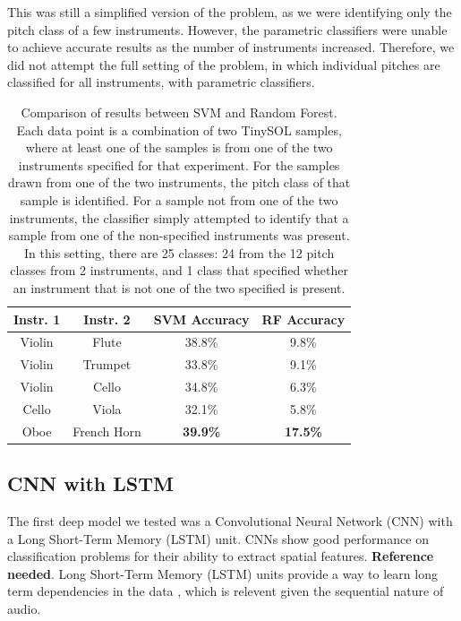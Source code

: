 \documentclass{article}
\begin{document}
This was still a simplified version of the problem, as we were identifying only the pitch class of a few instruments. However, the parametric classifiers were unable to achieve accurate results as the number of instruments increased. Therefore, we did not attempt the full setting of the problem, in which individual pitches are classified for all instruments, with parametric classifiers. 

\begin{table}
  \begin{center}
    \label{tab:table1}
    \begin{tabular}{|c|c|c|c|} 
    	  \hline
      \textbf{Instr. 1} & \textbf{Instr. 2} & \textbf{SVM Accuracy} & \textbf{RF Accuracy}\\
      \hline
      Violin & Flute & 38.8\% & 9.8\% \\
      \hline
      Violin & Trumpet & 33.8\% & 9.1\% \\
      \hline
      Violin & Cello & 34.8\% & 6.3\% \\
      \hline
      Cello & Viola & 32.1\% & 5.8\% \\
      \hline
      Oboe & French Horn & \textbf{39.9\%} & \textbf{17.5\%} \\
      \hline
    \end{tabular}
  \end{center}
  \caption{Comparison of results between SVM and Random Forest. Each data point is a combination of two TinySOL samples, where at least one of the samples is from one of the two instruments specified for that experiment. For the samples drawn from one of the two instruments, the pitch class of that sample is identified. For a sample not from one of the two instruments, the classifier simply attempted to identify that a sample from one of the non-specified instruments was present. In this setting, there are 25 classes: 24 from the 12 pitch classes from 2 instruments, and 1 class that specified whether an instrument that is not one of the two specified is present.}
\end{table}


\subsection{CNN with LSTM}

The first deep model we tested was a Convolutional Neural Network (CNN) with a Long Short-Term Memory (LSTM) unit. CNNs show good performance on classification problems for their ability to extract spatial features. \textbf{Reference needed}. Long Short-Term Memory (LSTM) units provide a way to learn long term dependencies in the data \cite{LSTM}, which is relevent given the sequential nature of audio.
\end{document}
